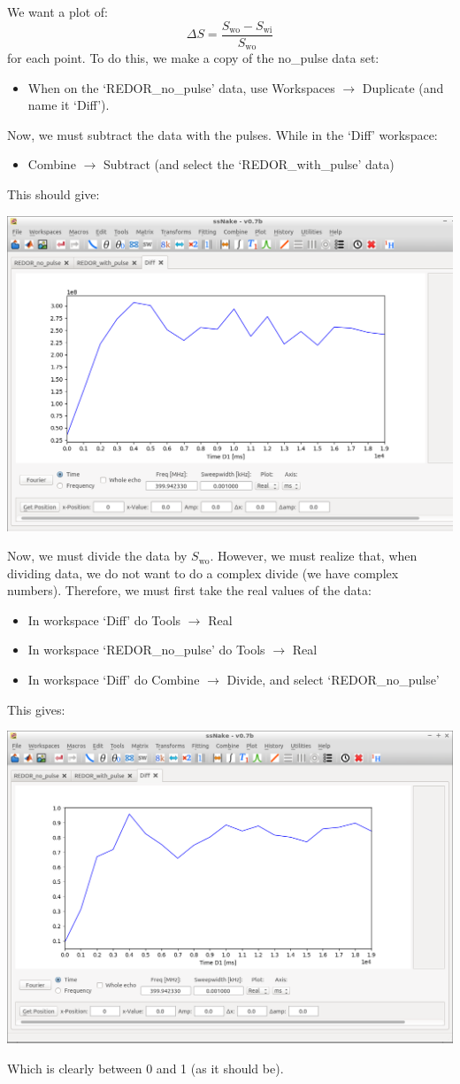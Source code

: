 \documentclass[11pt,a4paper]{article}
\begin{document}
We want a plot of:
\begin{equation*}
  \Delta S = \frac{S_\text{wo} - S_\text{wi}}{S_\text{wo}}
\end{equation*}
for each point. To do this, we make a copy of the no\_pulse data set:
\begin{itemize}
	\item When on the `REDOR\_no\_pulse' data, use Workspaces $\longrightarrow$ Duplicate (and name
	  it `Diff').
\end{itemize}
Now, we must subtract the data with the pulses. While in the `Diff' workspace:
\begin{itemize}
	\item Combine $\longrightarrow$ Subtract (and select the `REDOR\_with\_pulse' data)
\end{itemize}
This should give:
\begin{center}
\includegraphics[width=0.8\linewidth]{Figs/Fig4.png}
\end{center}
Now, we must divide the data by $S_\text{wo}$. However, we must realize that, when dividing data, we
do not want to do a complex divide (we have complex numbers). Therefore, we must first take the real
values of the data:
\begin{itemize}
	\item In workspace `Diff' do Tools $\longrightarrow$ Real
	\item In workspace `REDOR\_no\_pulse' do Tools $\longrightarrow$ Real
	\item In workspace `Diff' do  Combine $\longrightarrow$ Divide, and select `REDOR\_no\_pulse'
\end{itemize}
This gives:
\begin{center}
\includegraphics[width=0.8\linewidth]{Figs/Fig5.png}
\end{center}
Which is clearly between 0 and 1 (as it should be).
\end{document}
